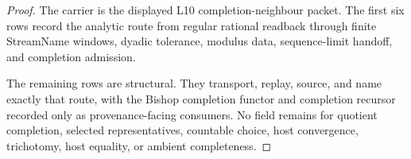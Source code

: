 \begin{proof}
The carrier is the displayed L10 completion-neighbour packet. The first six rows record the analytic route from regular rational readback through finite StreamName windows, dyadic tolerance, modulus data, sequence-limit handoff, and completion admission.

The remaining rows are structural. They transport, replay, source, and name exactly that route, with the Bishop completion functor and completion recursor recorded only as provenance-facing consumers. No field remains for quotient completion, selected representatives, countable choice, host convergence, trichotomy, host equality, or ambient completeness.
\end{proof}

